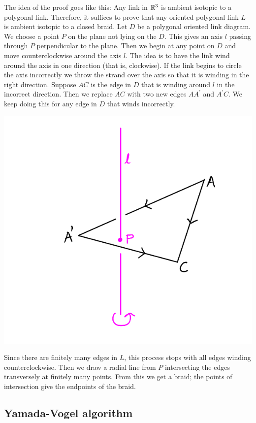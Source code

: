 The idea of the proof goes like this: Any link in $\mathbb{R}^3$ is ambient isotopic to a polygonal link. Therefore, it suffices to prove that any oriented polygonal link $L$ is ambient isotopic to a closed braid. Let $D$ be a polygonal oriented link diagram. We choose a point $P$ on the plane not lying on the $D$. This gives an axis $l$ passing through $P$ perpendicular to the plane. Then we begin at any point on $D$ and move counterclockwise around the axis $l$. The idea is to have the link wind around the axis in one direction (that is, clockwise). If the link begins to circle the axis incorrectly we throw the strand over the axis so that it is winding in the right direction. Suppose $AC$ is the edge in $D$ that is winding around $l$ in the incorrect direction. Then we replace $AC$ with two new edges $AA^{\prime}$ and $A^{\prime}C$. We keep doing this for any edge in $D$ that winds incorrectly. 
\begin{center}
  \includegraphics[scale=.25]{images/1.png}
\end{center}
Since there are finitely many edges in $L$, this process stops with all edges winding counterclockwise. Then we draw a radial line from $P$ intersecting the edges transversely at finitely many points. From this we get a braid; the points of intersection give the endpoints of the braid.

\subsection{Yamada-Vogel algorithm}

